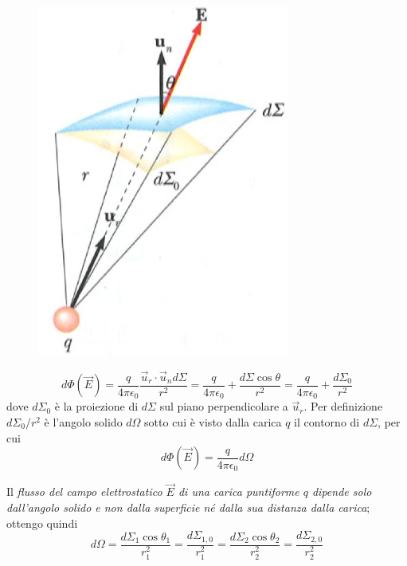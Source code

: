 \documentclass[class=book, crop=false, oneside, 12pt]{standalone}
\begin{document}
\begin{figure}[h]
    \includegraphics[scale=0.5]{flusso_superficie_1.png}
    \centering
    \caption{}
\end{figure}

\begin{equation*}
    d \Phi (\overrightarrow{E}) = \frac{q}{4 \pi \epsilon_0} \frac{\overrightarrow{u}_r \cdot \overrightarrow{u}_n d \Sigma}{r^2} = \frac{q}{4 \pi \epsilon_0} + \frac{d \Sigma \cos \theta}{r^2} = \frac{q}{4 \pi \epsilon_0} + \frac{d \Sigma_0 }{r^2}
\end{equation*}
dove \(d \Sigma_0\) è la proiezione di \(d \Sigma\) sul piano perpendicolare a \(\overrightarrow{u}_r\). 
Per definizione \(d \Sigma_0 / r^2\) è l'angolo solido \(d \Omega\) sotto cui è visto dalla carica \(q\) il contorno di \(d \Sigma\), per cui
\begin{equation}
    d \Phi (\overrightarrow{E}) = \frac{q}{4 \pi \epsilon_0} d \Omega
\end{equation}

Il \emph{flusso del campo elettrostatico \(\overrightarrow{E}\) di una carica puntiforme \(q\) dipende solo dall'angolo solido e non dalla superficie né dalla sua distanza dalla carica}; ottengo quindi
\begin{equation*}
    d \Omega = \frac{d \Sigma_1 \cos \theta_1}{r_1^2} = \frac{d \Sigma_{1,0}}{r_1^2} = \frac{d \Sigma_2 \cos \theta_2}{r_2^2} = \frac{d \Sigma_{2,0}}{r_2^2}
\end{equation*}
\end{document}

